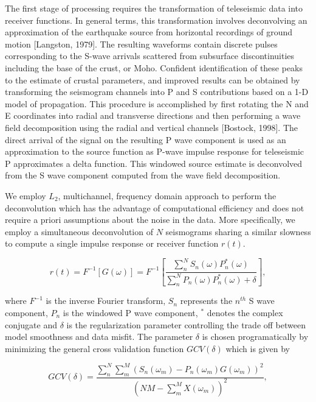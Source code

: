 \documentclass[draft, 12pt]{article}
\begin{document}
The first stage of processing requires the transformation of teleseismic data into receiver functions. In general terms, this transformation involves deconvolving an approximation of the earthquake source from horizontal recordings of ground motion [Langston, 1979]. The resulting waveforms contain discrete pulses corresponding to the S-wave arrivals scattered from subsurface discontinuities including the base of the crust, or Moho. Confident identification of these peaks to the estimate of crustal parameters, and improved results can be obtained by transforming the seismogram channels into P and S contributions based on a 1-D model of propagation. This procedure is accomplished by first rotating the N and E coordinates into radial and transverse directions and then performing a wave field decomposition using the radial and vertical channels [Bostock, 1998]. The direct arrival of the signal on the resulting P wave component is used as an approximation to the source function as P-wave impulse response for teleseismic P approximates a delta function. This windowed source estimate is deconvolved from the S wave component computed from the wave field decomposition.

We employ $L_2$, multichannel, frequency domain approach to perform the deconvolution which has the advantage of computational efficiency and does not require a priori assumptions about the noise in the data. More specifically, we employ a simultaneous deconvolution of $N$ seismograms sharing a similar slowness to compute a single impulse response or receiver function $r(t)$.

\begin{equation}
  r(t) = F^{-1} \left[ G(\omega) \right] = F^{-1}
 \left[ \frac {\sum_n^N S_n(\omega)P_n^*(\omega)} {\sum_n^N P_n(\omega)P_n^*(\omega) + \delta} \right ],
\end{equation}

where $F^{-1}$ is the inverse Fourier transform, $S_n$ represents the $n^{th}$ S wave component, $P_n$ is the windowed P wave component, $^*$ denotes the complex conjugate and $\delta$ is the regularization parameter controlling the trade off between model smoothness and data misfit. The parameter $\delta$ is chosen programatically by minimizing the general cross validation function $GCV(\delta)$ which is given by

\begin{equation}
  GCV(\delta) = \frac {\sum_n^N\sum_m^M \left( S_n(\omega_m) - P_n(\omega_m)G(\omega_m) \right)^2 }
                      { \left( NM - \sum_m^M X(\omega_m) \right)^2 },
\end{equation}
\end{document}
